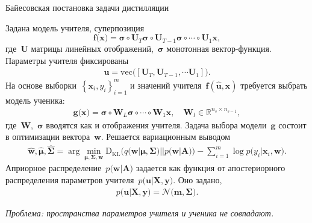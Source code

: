 \documentclass[10pt,pdf,hyperref={unicode}]{beamer}
\begin{document}

\begin{frame}{Байесовская постановка задачи дистилляции}

Задана модель учителя, суперпозиция
\[
\textbf{f}\bigr(\textbf{x}\bigr) = \bm{\sigma} \circ \textbf{U}_T\bm{\sigma} \circ \textbf{U}_{T-1}\bm{\sigma} \circ \cdots \circ \textbf{U}_1\textbf{x},
\]
где~$\textbf{U}$ матрицы линейных отображений,~$\bm{\sigma}$ монотонная вектор-функция. Параметры учителя фиксированы
\[
\begin{aligned}
\textbf{u} = \text{vec}\bigr(\left[\textbf{U}_T, \textbf{U}_{T-1}, \cdots \textbf{U}_1\right]\bigr).
\end{aligned}
\]
На основе выборки~$\left\{\textbf{x}_i, y_i\right\}_{i=1}^{m}$ и значений учителя~$\textbf{f}(\hat{\textbf{u}},\textbf{x})$ требуется выбрать модель ученика:
\[
\begin{aligned}
\textbf{g}\bigr(\textbf{x}\bigr) = \bm{\sigma} \circ \textbf{W}_L\bm{\sigma} \circ \cdots \circ \textbf{W}_1\textbf{x}, \quad \textbf{W}_l \in \mathbb{R}^{n_s \times n_{s-1}},
\end{aligned}
\]
где~$\textbf{W}$,~$\bm{\sigma}$ вводятся как и отображения учителя. Задача выбора модели~$\textbf{g}$ состоит в оптимизации вектора~$\textbf{w}$.  Решается  вариационным выводом
\[
\begin{aligned}
\hat{\textbf{w}}, \hat{\bm{\mu}}, \hat{\bm{\Sigma}} = \arg \min_{\bm{\mu}, \bm{\Sigma}, \textbf{w}} \text{D}_{\text{KL}}\bigr(q\bigr(\textbf{w}|\bm{\mu}, \bm{\Sigma}\bigr)||p\bigr(\textbf{w}|\textbf{A}\bigr)\bigr) - \sum_{i=1}^{m}\log p\bigr(y_i|\textbf{x}_{i}, \textbf{w}\bigr).
\end{aligned}
\]
Априорное распределение~$p\bigr(\textbf{w}|\textbf{A}\bigr)$ задается как функция от апостериорного распределения параметров учителя~$p\bigr(\textbf{u}|\textbf{X}, \textbf{y}\bigr)$.  Оно задано,
\[
\begin{aligned}
p\bigr(\textbf{u}|\textbf{X}, \textbf{y}\bigr) = \mathcal{N}\bigr(\textbf{m}, \bm{\Sigma}\bigr).
\end{aligned}
\]

{\it \color{red}Проблема: пространства параметров учителя и ученика не совпадают.}
\end{frame}
\end{document}
